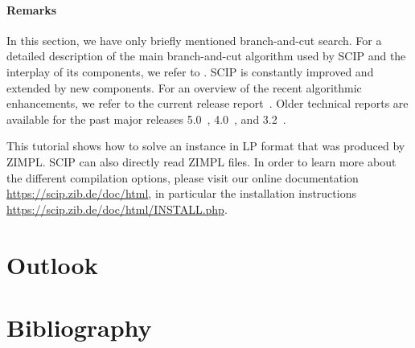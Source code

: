 \documentclass[a4paper,10pt]{article}
\begin{document}
\paragraph{Remarks}

In this section, we have only briefly mentioned branch-and-cut search.
%
For a detailed description of the main branch-and-cut algorithm used by SCIP and the interplay of its components, we refer to
\cite{Achterberg2007}.
%
SCIP is constantly improved and extended by new components.
%
For an overview of the recent algorithmic enhancements, we refer to the current release report~\cite{SCIP6}.
%
Older technical reports are available for the past major releases 5.0~\cite{SCIP5}, 4.0~\cite{SCIP4}, and 3.2~\cite{SCIP32}.

This tutorial shows how to solve an instance in LP format that was produced by ZIMPL.
%
SCIP can also directly read ZIMPL files.
%
In order to learn more about the different compilation options, please visit our online documentation \url{https://scip.zib.de/doc/html},
in particular the installation instructions \url{https://scip.zib.de/doc/html/INSTALL.php}.

\section{Outlook}


\cite{*}

\section*{Bibliography}



\end{document}
